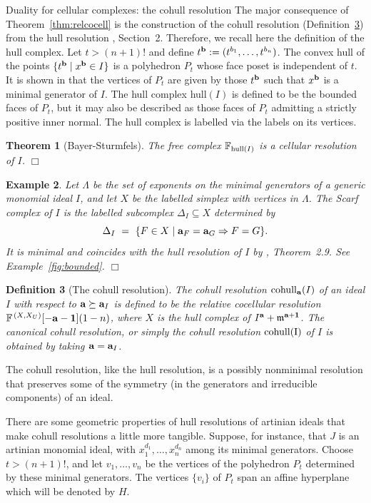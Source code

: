 \documentclass[12pt,leqno]{article}
\newtheorem{thm}{Theorem}[section]
\newtheorem{defn}[thm]{Definition}
\newtheorem{example}[thm]{Example}
\def\aa{{{\rm \bf a}}}
\def\bb{{{\rm \bf b}}}
\def\mm{{\mathfrak m}}
\def\FF{{\mathbb F}}
\begin{document}
\begin{section}{Duality for cellular complexes: the cohull resolution}
The major consequence of Theorem~\ref{thm:relcocell} is the construction
of the cohull resolution (Definition~\ref{defn:cohull}) from the hull
resolution \cite{BS}, Section~2.  Therefore, we recall here the
definition of the hull complex. Let $t > (n+1)!$ and define $t^\bb :=
(t^{b_1},\ldots,t^{b_n})$.  The convex hull of the points $\{t^\bb \mid
x^\bb \in I\}$ is a polyhedron $P_t$ whose face poset is independent of
$t$.  It is shown in \cite{BS} that the vertices of $P_t$ are given by
those $t^\bb$ such that $x^\bb$ is a minimal generator of $I$.  The hull
complex hull$(I)$ is defined to be the bounded faces of $P_t$, but it may
also be described as those faces of $P_t$ admitting a strictly positive
inner normal.  The hull complex is labelled via the labels on its
vertices.
\begin{thm}[Bayer-Sturmfels] \label{thm:hull}
The free complex $\FF_{{\rm hull}(I)}$ is a cellular resolution of $I$.
\hfill $\Box$
\end{thm}
\begin{example} \label{ex:scarf} \rm
Let $\Lambda$ be the set of exponents on the minimal generators of a
generic monomial ideal $I$, and let $X$ be the labelled simplex with
vertices in $\Lambda$.  The {\it Scarf complex} of $I$ is the labelled
subcomplex $\Delta_I \subseteq X$ determined by
$$
  \Delta_I \ =\ \{F \in X \mid \aa_F = \aa_G \Rightarrow F = G\}.
$$
It is minimal and coincides with the hull resolution of $I$ by \cite{BS},
Theorem~2.9.  See Example~\ref{fig:bounded}. \hfill $\Box$
\end{example}

\begin{defn}[The cohull resolution] \label{defn:cohull}
The {\rm cohull resolution} ${\rm cohull}_\aa(I)$ of an ideal $I$ with
respect to $\aa \succeq \aa_I$ is defined to be the relative cocellular
resolution $\FF^{\,(X,X_U)}[-\aa -{\bf 1}](1-n)$, where $X$ is the hull
complex of $I^\aa + \mm^{\aa + {\bf 1}}$.  The {\rm canonical cohull
resolution}, or simply {\rm the cohull resolution} ${\rm cohull(I)}$ of
$I$ is obtained by taking $\aa = \aa_I$.
\end{defn}
The cohull resolution, like the hull resolution, is a possibly nonminimal
resolution that preserves some of the symmetry (in the generators and
irreducible components) of an ideal.

There are some geometric properties of hull resolutions of artinian
ideals that make cohull resolutions a little more tangible.  Suppose, for
instance, that $J$ is an artinian monomial ideal, with $x_1^{d_1},
\ldots, x_n^{d_n}$ among its minimal generators.  Choose $t > (n+1)!$,
and let $v_1, \ldots, v_n$ be the vertices of the polyhedron $P_t$
determined by these minimal generators.  The vertices $\{v_i\}$ of $P_t$
span an affine hyperplane which will be denoted by $H$.


\end{section}
\end{document}
